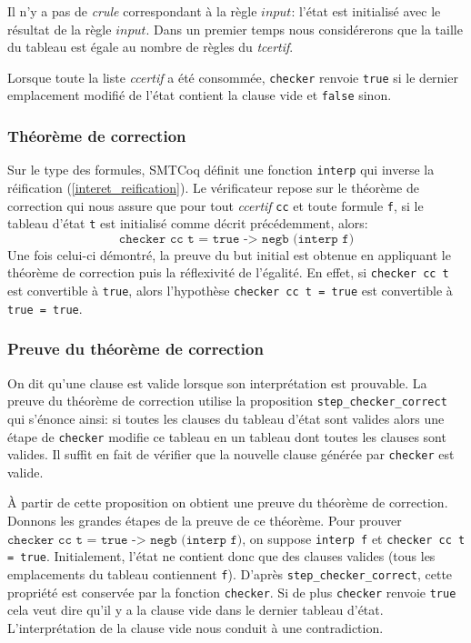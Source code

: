 \documentclass[11pt]{article}
\begin{document}
Il n'y a pas de \textit{crule} correspondant à la règle $input$: l'état est initialisé avec le résultat de la règle $input$. Dans un premier temps nous considérerons que la taille du tableau est égale au nombre de règles du \textit{tcertif}.\medbreak

Lorsque toute la liste \textit{ccertif} a été consommée, \texttt{checker} renvoie \texttt{true} si le dernier emplacement modifié de l'état contient la clause vide et \texttt{false} sinon.

\subsubsection{Théorème de correction}

Sur le type des formules, SMTCoq définit une fonction \texttt{interp} qui inverse la réification (\ref{interet_reification}). Le vérificateur repose sur le théorème de correction qui nous assure que pour tout \textit{ccertif} \texttt{cc} et toute formule \texttt{f}, si le tableau d'état \texttt{t} est initialisé comme décrit précédemment,  alors: 
\[ \texttt{checker cc t = true -> negb (interp f)} \]
 Une fois celui-ci démontré, la preuve du but initial est obtenue en appliquant le théorème de correction puis la réflexivité de l'égalité. En effet, si \texttt{checker cc t} est convertible à \texttt{true}, alors l'hypothèse \texttt{checker cc t = true} est convertible à \texttt{true = true}.

\subsubsection{Preuve du théorème de correction} \label{preuve_correction}

On dit qu'une clause est valide lorsque son interprétation est prouvable. La preuve du théorème de correction utilise la proposition \texttt{step\_checker\_correct} qui s'énonce ainsi: si toutes les clauses du tableau d'état sont valides alors une étape de \texttt{checker} modifie ce tableau en un tableau dont toutes les clauses sont valides. Il suffit en fait de vérifier que la nouvelle clause générée par \texttt{checker} est valide. \medbreak

À partir de cette proposition on obtient une preuve du théorème de correction. Donnons les grandes étapes de la preuve de ce théorème. Pour prouver $\texttt{checker cc t = true -> negb (interp f)}$, on suppose \texttt{interp f} et \texttt{checker cc t = true}. Initialement, l'état ne contient donc que des clauses valides (tous les emplacements du tableau contiennent \texttt{f}). D'après \texttt{step\_checker\_correct}, cette propriété est conservée par la fonction \texttt{checker}. Si de plus \texttt{checker} renvoie \texttt{true} cela veut dire qu'il y a la clause vide dans le dernier tableau d'état. L'interprétation de la clause vide nous conduit à une contradiction.
\end{document}
